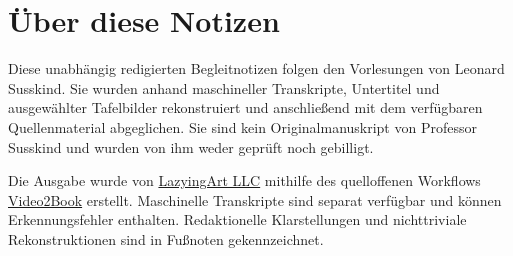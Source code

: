 \documentclass[11pt,oneside]{book}
\begin{document}
\frontmatter
\hypersetup{pageanchor=false}

\hypersetup{pageanchor=true}

\clearpage
\chapter*{Über diese Notizen}
Diese unabhängig redigierten Begleitnotizen folgen den Vorlesungen von Leonard Susskind. Sie wurden anhand maschineller Transkripte, Untertitel und ausgewählter Tafelbilder rekonstruiert und anschließend mit dem verfügbaren Quellenmaterial abgeglichen. Sie sind kein Originalmanuskript von Professor Susskind und wurden von ihm weder geprüft noch gebilligt.

Die Ausgabe wurde von \href{https://lazying.art}{LazyingArt LLC} mithilfe des quelloffenen Workflows \href{https://github.com/lachlanchen/Video2Book}{Video2Book} erstellt. Maschinelle Transkripte sind separat verfügbar und können Erkennungsfehler enthalten. Redaktionelle Klarstellungen und nichttriviale Rekonstruktionen sind in Fußnoten gekennzeichnet.
\clearpage
\tableofcontents
\mainmatter










\end{document}
